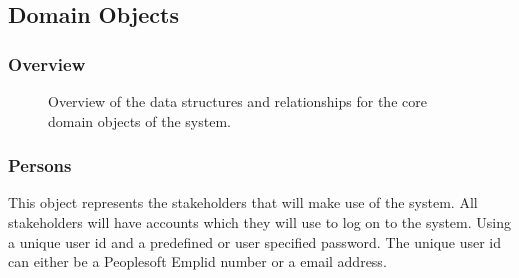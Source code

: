 \documentclass[12pt]{article}
\begin{document}

\subsection{Domain Objects} %
\subsubsection{Overview}

\begin{figure}[H]
\centering	
{}
\caption{Overview of the data structures and relationships for the core domain objects of the
system.}
\end{figure}

\newpage
\subsubsection{Persons}
This object represents the stakeholders that will make use of the system. All stakeholders will have accounts which they will use to log on to the system. Using a unique user id and a predefined or user specified password. The unique user id can either be a Peoplesoft Emplid number or a email address.
\end{document}
